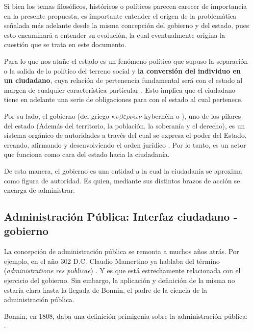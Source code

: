 Si bien los temas filosóficos, históricos o políticos parecen carecer de
importancia en la presente propuesta, es importante entender el origen de la
problemática señalada más adelante desde la misma concepción del gobierno y del
estado, pues esto encaminará a entender su evolución, la cual eventualmente
origina la cuestión que se trata en este documento.

Para lo que nos atañe el estado es un fenómeno político que supuso
la separación o la salida de lo político del terreno social y \textbf{la
conversión del individuo en un ciudadano}, cuya relación de pertenencia
fundamental será con el estado al margen de cualquier característica particular
\cite{gordilloperezestadosurge}. Esto implica que el ciudadano tiene en adelante
una serie de obligaciones para con el estado al cual pertenece.


Por su lado, el gobierno (del griego
$\kappa \upsilon \beta \varepsilon \rho \nu \acute{\epsilon} \iota \nu$
kybernéin  o ), uno de los pilares del estado (Además del territorio, la población, la soberanía y el derecho), es un
sistema orgánico de autoridades a través del cual se expresa el poder del
Estado, creando, afirmando y desenvolviendo el orden jurídico
\cite{jorgefernandezruizdederecho}. Por lo tanto, es un actor que
funciona como cara del estado hacia la ciudadanía.

De esta manera, el gobierno es una entidad a la cual la ciudadanía se aproxima como figura de autoridad. Es quien, mediante sus distintos brazos de acción se encarga de administrar.

\subsection{Administración Pública: Interfaz ciudadano - gobierno}

La concepción de administración pública se remonta a muchos años atrás. Por
ejemplo, en el año 302 D.C. Claudio Mamertino ya hablaba del término
 (\textit{administratione res publicae})
\cite{nixonsaylorinpraiseroman}. Y es que está estrechamente relacionada con el
ejercicio del gobierno. Sin embargo, la aplicación y definición de la misma no
estaría clara hasta la llegada de Bonnin, el padre de la ciencia de la
administración pública.

Bonnin, en 1808, daba una definición primigenia sobre la administración pública:
 \cite{omarguerrerobonninsigloxxi}.

